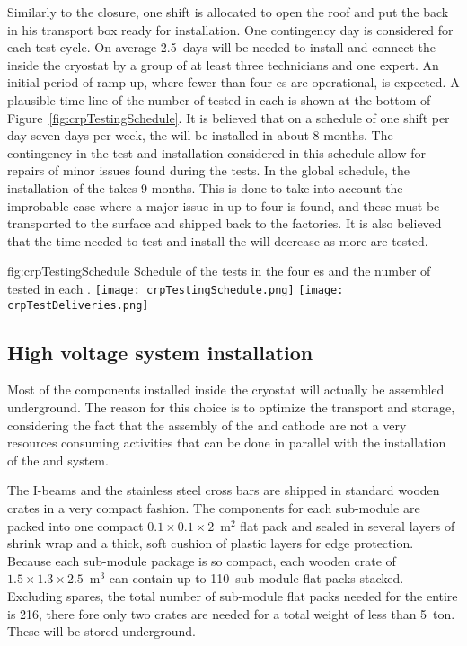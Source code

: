 Similarly to the  \coldbox closure, one shift is allocated to open the roof and put the  back in his transport box ready for installation.
One contingency day is considered for each  \coldbox test cycle.
On average 2.5~days will be needed to install and connect the  inside the cryostat by a group of at least three technicians and one  expert.
An initial period of ramp up, where fewer than four  \coldbox{}es are operational, is expected.
A plausible time line of the number of  tested in each  \coldbox is shown at the bottom of Figure~\ref{fig:crpTestingSchedule}.
It is believed that on a schedule of one shift per day seven days per week, the  will be installed in about 8 months.
The contingency in the test and installation considered in this schedule allow for repairs of minor issues found during the tests.
In the global schedule, the installation of the  takes 9 months.
This is done to take into account the improbable case where a major issue in up to four  is found, and these  must be transported to the surface and shipped back to the factories.
It is also believed that the time needed to test and install the  will decrease as more  are tested.

\begin{dunefigure}{fig:crpTestingSchedule}
{Schedule of the  tests in the four  \coldbox{}es and the number of  tested in each  \coldbox.}
\texttt{[image: crpTestingSchedule.png]}
\texttt{[image: crpTestDeliveries.png]}
\end{dunefigure}


\subsection{High voltage system installation}
Most of the  components installed inside the cryostat will actually be assembled underground.
The reason for this choice is to optimize the transport and storage, considering the fact that the assembly of the  and cathode are not a very resources consuming activities that can be done in parallel with the installation of the  and  system.

The   I-beams and the stainless steel cross bars are shipped in standard wooden crates in a very compact fashion.
The components for each  sub-module are packed into one compact  $0.1 \times 0.1 \times 2$~m$^2$ flat pack and sealed in several layers of shrink wrap and a thick, soft cushion of plastic layers for edge protection.
Because each sub-module package is so compact, each wooden crate of $1.5 \times 1.3 \times 2.5$~m$^3$ can contain up to 110~sub-module flat packs stacked.
Excluding spares, the total number of sub-module flat packs needed for the entire  is 216, there fore only two crates are needed for a total weight of less than 5~ton. These will be stored underground.

